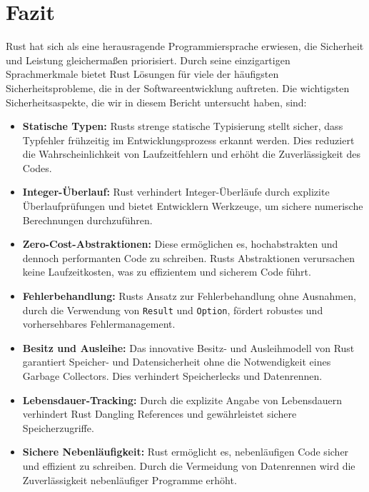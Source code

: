 \chapter{Fazit}

Rust hat sich als eine herausragende Programmiersprache erwiesen, die Sicherheit und Leistung gleichermaßen priorisiert. 
Durch seine einzigartigen Sprachmerkmale bietet Rust Lösungen für viele der häufigsten Sicherheitsprobleme, die in der Softwareentwicklung auftreten. 
Die wichtigsten Sicherheitsaspekte, die wir in diesem Bericht untersucht haben, sind:

\begin{itemize}
    \item \textbf{Statische Typen:} Rusts strenge statische Typisierung stellt sicher, dass Typfehler frühzeitig im Entwicklungsprozess erkannt werden. 
    Dies reduziert die Wahrscheinlichkeit von Laufzeitfehlern und erhöht die Zuverlässigkeit des Codes.
    
    \item \textbf{Integer-Überlauf:} Rust verhindert Integer-Überläufe durch explizite Überlaufprüfungen und bietet Entwicklern Werkzeuge, um sichere numerische Berechnungen durchzuführen.
    
    \item \textbf{Zero-Cost-Abstraktionen:} Diese ermöglichen es, hochabstrakten und dennoch performanten Code zu schreiben.
    Rusts Abstraktionen verursachen keine Laufzeitkosten, was zu effizientem und sicherem Code führt.
    
    \item \textbf{Fehlerbehandlung:} Rusts Ansatz zur Fehlerbehandlung ohne Ausnahmen, durch die Verwendung von \texttt{Result} und \texttt{Option}, fördert robustes und vorhersehbares Fehlermanagement.
    
    \item \textbf{Besitz und Ausleihe:} Das innovative Besitz- und Ausleihmodell von Rust garantiert Speicher- und Datensicherheit ohne die Notwendigkeit eines Garbage Collectors. 
    Dies verhindert Speicherlecks und Datenrennen.
    
    \item \textbf{Lebensdauer-Tracking:} Durch die explizite Angabe von Lebensdauern verhindert Rust Dangling References und gewährleistet sichere Speicherzugriffe.
    
    \item \textbf{Sichere Nebenläufigkeit:} Rust ermöglicht es, nebenläufigen Code sicher und effizient zu schreiben. 
    Durch die Vermeidung von Datenrennen wird die Zuverlässigkeit nebenläufiger Programme erhöht.
\end{itemize}
